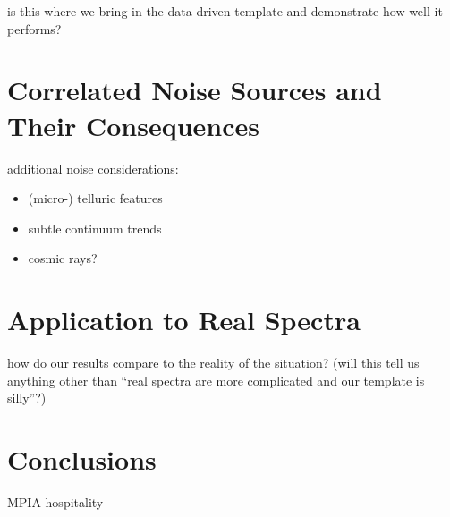 \documentclass[modern]{aastex61}
\begin{document}
is this where we bring in the data-driven template and demonstrate how well it performs?

\section{Correlated Noise Sources and Their Consequences}

additional noise considerations:
\begin{itemize}
\item (micro-) telluric features
\item subtle continuum trends
\item cosmic rays?
\end{itemize}

\section{Application to Real Spectra}

how do our results compare to the reality of the situation? (will this tell us anything other than ``real spectra are more complicated and our template is silly''?)


\section{Conclusions}

\acknowledgements
MPIA hospitality


\end{document}
